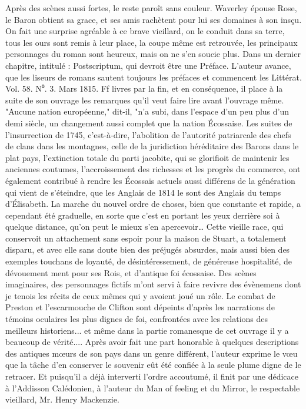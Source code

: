 Après des scènes aussi fortes, le reste paroît sans couleur. Waverley épouse Rose, le Baron obtient sa grace, et ses amis rachètent pour lui ses domaines à son insçu. On fait une surprise agréable à ce brave vieillard, on le conduit dans sa terre, tous les ours sont remis à leur place, la coupe même est retrouvée, les principaux personnages du roman sont heureux, mais on ne s'en soucie plus.
Dans un dernier chapitre, intitulé : Postscriptum, qui devroit être une Préface. L'auteur avance, que les liseurs de romans sautent toujours les préfaces et commencent les
Littérat. Vol. 58. N⁰. 3. Mars 1815. Ff\setcounter{page}{394} livres par la fin, et en conséquence, il place à la suite de son ouvrage les remarques qu’il veut faire lire avant l’ouvrage même.
"Aucune nation européenne," dit-il, "n’a subi, dans l’espace d’un peu plus d’un demi siècle, un changement aussi complet que la nation Écossaise. Les suites de l’insurrection de 1745, c’est-à-dire, l’abolition de l’autorité patriarcale des chefs de clans dans les montagnes, celle de la juridiction héréditaire des Barons dans le plat pays, l’extinction totale du parti jacobite, qui se glorifioit de maintenir les anciennes coutumes, l’accroissement des richesses et les progrès du commerce, ont également contribué à rendre les Écossais actuels aussi différens de la génération qui vient de s’éteindre, que les Anglais de 1814 le sont des Anglais du temps d’Élisabeth. La marche du nouvel ordre de choses, bien que constante et rapide, a cependant été graduelle, en sorte que c’est en portant les yeux derrière soi à quelque distance, qu’on peut le mieux s’en apercevoir… Cette vieille race, qui conservoit un attachement sans espoir pour la maison de Stuart, a totalement disparu, et avec elle sans doute bien des préjugés absurdes, mais aussi bien des exemples touchans de loyauté, de désintéressement, de généreuse hospitalité, de dévouement\setcounter{page}{395} ment pour ses Rois, et d'antique foi écossaise.
Des scènes imaginaires, des personnages fictifs m'ont servi à faire revivre des évènemens dont je tenois les récits de ceux mêmes qui y avoient joué un rôle.
Le combat de Preston et l'escarmouche de Clifton sont dépeints d'après les narrations de témoins oculaires les plus dignes de foi, confrontées avec les relations des meilleurs historiens... et même dans la partie romanesque de cet ouvrage il y a beaucoup de vérité....
Après avoir fait une part honorable à quelques descriptions des antiques mœurs de son pays dans un genre différent, l'auteur exprime le vœu que la tâche d'en conserver le souvenir eût été confiée à la seule plume digne de le retracer. Et puisqu'il a déjà interverti l'ordre accoutumé, il finit par une dédicace à l'Addisson Calédonien, à l'auteur du Man of feeling et du Mirror, le respectable vieillard, Mr. Henry Mackenzie.